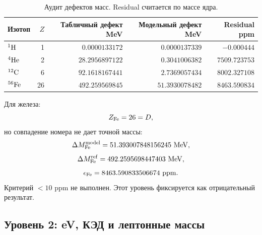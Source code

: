 \documentclass[11pt]{article}
\begin{document}
\begin{table}[h]
\centering
\caption{Аудит дефектов масс.  Residual считается по массе ядра.}
\begin{tabular}{lrrrr}
\toprule
Изотоп & $Z$ & Табличный дефект MeV & Модельный дефект MeV & Residual ppm \\
\midrule
$^1{\rm H}$     & 1  & $0.0000133172$ & $0.0000137339$ & $-0.000444$ \\
$^4{\rm He}$    & 2  & $28.2956897122$ & $0.3041006382$ & $7509.723753$ \\
$^{12}{\rm C}$  & 6  & $92.1618167441$ & $2.7369057434$ & $8002.327108$ \\
$^{56}{\rm Fe}$ & 26 & $492.259569845$ & $51.3930078482$ & $8463.590834$ \\
\bottomrule
\end{tabular}
\end{table}

Для железа:
\begin{equation}
    Z_{\rm Fe}=26=D,
\end{equation}
но совпадение номера не дает точной массы:
\begin{equation}
    \Delta M_{\rm Fe}^{\rm model}=51.393007848156245~{\rm MeV},
\end{equation}
\begin{equation}
    \Delta M_{\rm Fe}^{\rm ref}=492.2595698447403~{\rm MeV},
\end{equation}
\begin{equation}
    \epsilon_{\rm Fe}=8463.590833506674~{\rm ppm}.
\end{equation}
Критерий $<10$ ppm не выполнен.  Этот уровень фиксируется как отрицательный
результат.

\subsection{Уровень 2: eV, КЭД и лептонные массы}
\end{document}
